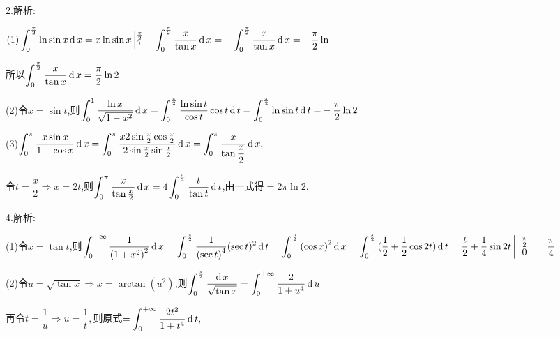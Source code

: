 2.解析:

$(1)\displaystyle\int_0^{\frac{\pi }{2}} {\ln \sin x\operatorname{\mathop{}\!\mathrm{d}} x = x\ln \sin x\left| {_0^{\frac{\pi }{2}}} \right. - } \displaystyle\int_0^{\frac{\pi }{2}} {\dfrac{x}{{\tan x}}} \operatorname{\mathop{}\!\mathrm{d}} x =  - \displaystyle\int_0^{\frac{\pi }{2}} {\dfrac{x}{{\tan x}}} \operatorname{\mathop{}\!\mathrm{d}} x =  - \dfrac{\pi }{2}\ln $

所以$\displaystyle\int_0^{\frac{\pi }{2}} {\dfrac{x}{{\tan x}}} \operatorname{\mathop{}\!\mathrm{d}} x = \dfrac{\pi }{2}\ln 2$

(2)令$x = \sin t$,则$\displaystyle\int_0^1 {\dfrac{{\ln x}}{{\sqrt {1 - {x^2}} }}} \operatorname{\mathop{}\!\mathrm{d}} x = \displaystyle\int_0^{\frac{\pi }{2}} {\dfrac{{\ln \sin t}}{{\cos t}}\cos t\operatorname{\mathop{}\!\mathrm{d}} t = \displaystyle\int_0^{\frac{\pi }{2}} {\ln \sin t\operatorname{\mathop{}\!\mathrm{d}} t = } }  - \dfrac{\pi }{2}\ln 2$

(3)$\displaystyle\int_0^\pi  {\dfrac{{x\sin x}}{{1 - \cos x}}\operatorname{\mathop{}\!\mathrm{d}}x}  = \displaystyle\int_0^\pi  {\dfrac{{x2\sin \frac{x}{2}\cos \frac{x}{2}}}{{2\sin \frac{x}{2}\sin \frac{x}{2}}}} \operatorname{\mathop{}\!\mathrm{d}} x = \displaystyle\int_0^\pi  {\dfrac{x}{{\tan \dfrac{x}{2}}}} \operatorname{\mathop{}\!\mathrm{d}} x,$

令$t = \dfrac{x}{2} \Rightarrow x = 2t$,则$\displaystyle\int_0^\pi  {\frac{x}{{\tan \frac{x}{2}}}} \operatorname{\mathop{}\!\mathrm{d}} x = 4\displaystyle\int_0^{\frac{\pi }{2}} {\dfrac{t}{{\tan t}}} \operatorname{\mathop{}\!\mathrm{d}} t$,由一式得$ = 2\pi \ln 2$.

4.解析:

(1)令$x = \tan t$,则$\displaystyle\int_0^{ + \infty } {\dfrac{1}{{{{(1 + {x^2})}^2}}}} \rd x = \displaystyle\int_0^{\frac{\pi }{2}} {\dfrac{1}{{{{(\sec t)}^4}}}} {(\sec t)^2}\rd t = \displaystyle\int_0^{\frac{\pi }{2}} {{{(\cos x)}^2}\rd x = \displaystyle\int_0^{\frac{\pi }{2}} {(\dfrac{1}{2}} }  + \dfrac{1}{2}\cos 2t)\rd t = \dfrac{t}{2} + \dfrac{1}{4}\sin 2t\left| {\begin{array}{*{20}{c}}
  {\frac{\pi }{2}} \\
  0
\end{array}} \right. = \dfrac{\pi }{4}$

(2)令$u = \sqrt {\tan x}  \Rightarrow x = \arctan ({u^2})$,则$\displaystyle\int_0^{\frac{\pi }{2}} {\dfrac{{\operatorname{\mathop{}\!\mathrm{d}} x}}{{\sqrt {\tan x} }}}  = \displaystyle\int_0^{ + \infty } {\dfrac{2}{{1 + {u^4}}}} \operatorname{\mathop{}\!\mathrm{d}} u$

再令$t = \dfrac{1}{u} \Rightarrow u = \dfrac{1}{t},$则原式$ = \displaystyle\int_0^{ + \infty } \dfrac{{2t^2}}{{1 + {t^4}}} \operatorname{\mathop{}\!\mathrm{d}} t,$

